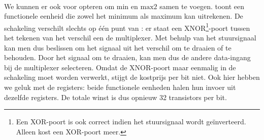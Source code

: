 \paragraph{}
We kunnen er ook voor opteren om $\mbox{min}$ en $\mbox{max2}$ samen te voegen.  toont een functionele eenheid die zowel het minimum als maximum kan uitrekenen. De schakeling verschilt slechts op \'e\'en punt van : er staat een XNOR\footnote{Een XOR-poort is ook correct indien het stuursignaal wordt ge\"inverteerd. Alleen kost een XOR-poort meer.}-poort tussen het tekenen van het verschil een de multiplexer. Met behulp van het stuursignaal kan men dus beslissen om het signaal uit het verschil om te draaien of te behouden. Door het signaal om te draaien, kan men dus de andere data-ingang bij de multiplexer selecteren. Omdat de XNOR-poort maar eenmalig in de schakeling moet worden verwerkt, stijgt de kostprijs per bit niet. Ook hier hebben we geluk met de registers: beide functionele eenheden halen hun invoer uit dezelfde registers. De totale winst is dus opnieuw 32 transistors per bit.
